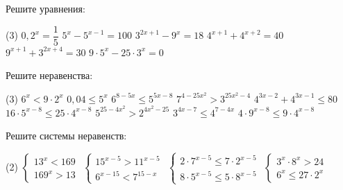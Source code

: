 \begin{class}[number=6]
	\begin{listofex}
		\item Решите уравнения:
		\begin{tasks}(3)
			\task \( 0,2^x=\dfrac{1}{5} \)
			\task \( 5^x-5^{x-1}=100 \)
			\task \( 3^{2x+1}-9^x=18 \)
			\task \( 4^{x+1}+4^{x+2}=40 \)
			\task \( 9^{x+1}+3^{2x+4}=30 \)
			\task \( 9\cdot 5^x-25 \cdot 3^x=0 \)
		\end{tasks}
		\item Решите неравенства: %
		\begin{tasks}(3)
			\task \( 6^x<9 \cdot 2^x \)
			\task \( 0,04 \le 5^x \)
			\task \( 6^{8-5x} \le 5^{5x-8} \)
			\task \( 7^{4-25x^2} > 3^{25x^2-4} \)
			\task \( 4^{3x-2} + 4^{3x-1} \le 80 \)
			\task \( 16 \cdot 5^{x-8} \le 25 \cdot 4^{x-8} \)
			\task \( 5^{25-4x^2} > 2^{4x^2-25} \)
			\task \( 3^{4x-7} \le 4^{7-4x}  \)
			\task \( 4 \cdot 9^{x-8} \le 9 \cdot 4^{x-8} \)
		\end{tasks}
		\item Решите системы неравенств:
		\begin{tasks}(2)
			\task \( \begin{cases} 13^x<169 \\ 169^x > 13 \end{cases} \)
			\task \( \begin{cases} 15^{x-5}>11^{x-5} \\ 6^{x-15}<7^{15-x} \end{cases} \)
			\task \( \begin{cases} 2 \cdot 7^{x-5} \le 7 \cdot 2^{x-5} \\ 8 \cdot 5^{x-5} \le 5 \cdot 8^{x-5} \end{cases} \)
			\task \( \begin{cases} 3^x \cdot 8^x > 24 \\ 6^x \le 27 \cdot 2^x \end{cases} \)
		\end{tasks}
	\end{listofex}
\end{class}
	
